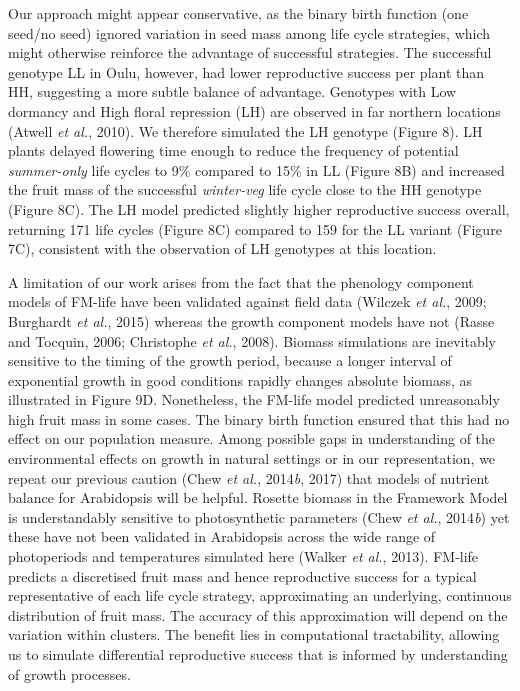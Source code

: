 \documentclass[phd]{infthesis}
\begin{document}
Our approach might appear conservative, as the binary birth function
(one seed/no seed) ignored variation in seed mass among life cycle
strategies, which might otherwise reinforce the advantage of successful
strategies. The successful genotype LL in Oulu, however, had lower
reproductive success per plant than HH, suggesting a more subtle balance
of advantage. Genotypes with Low dormancy and High floral repression
(LH) are observed in far northern locations (Atwell \emph{et al.},
2010). We therefore simulated the LH genotype (Figure 8). LH plants
delayed flowering time enough to reduce the frequency of potential
\emph{summer-only} life cycles to 9\% compared to 15\% in LL (Figure 8B)
and increased the fruit mass of the successful \emph{winter-veg} life
cycle close to the HH genotype (Figure 8C). The LH model predicted
slightly higher reproductive success overall, returning 171 life cycles
(Figure 8C) compared to 159 for the LL variant (Figure 7C), consistent
with the observation of LH genotypes at this location.

A limitation of our work arises from the fact that the phenology
component models of FM-life have been validated against field data
(Wilczek \emph{et al.}, 2009; Burghardt \emph{et al.}, 2015) whereas the
growth component models have not (Rasse and Tocquin, 2006; Christophe
\emph{et al.}, 2008). Biomass simulations are inevitably sensitive to
the timing of the growth period, because a longer interval of
exponential growth in good conditions rapidly changes absolute biomass,
as illustrated in Figure 9D. Nonetheless, the FM-life model predicted
unreasonably high fruit mass in some cases. The binary birth function
ensured that this had no effect on our population measure. Among
possible gaps in understanding of the environmental effects on growth in
natural settings or in our representation, we repeat our previous
caution (Chew \emph{et al.}, 2014\emph{b}, 2017) that models of nutrient
balance for Arabidopsis will be helpful. Rosette biomass in the
Framework Model is understandably sensitive to photosynthetic parameters
(Chew \emph{et al.}, 2014\emph{b}) yet these have not been validated in
Arabidopsis across the wide range of photoperiods and temperatures
simulated here (Walker \emph{et al.}, 2013). FM-life predicts a
discretised fruit mass and hence reproductive success for a typical
representative of each life cycle strategy, approximating an underlying,
continuous distribution of fruit mass. The accuracy of this
approximation will depend on the variation within clusters. The benefit
lies in computational tractability, allowing us to simulate differential
reproductive success that is informed by understanding of growth
processes.
\end{document}
